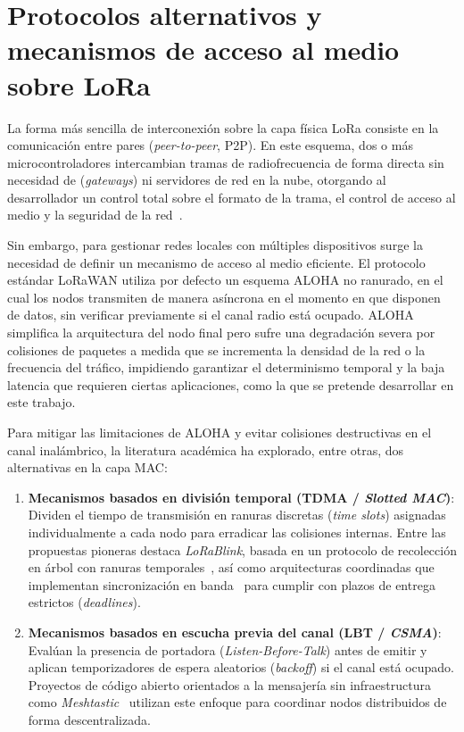 \section{Protocolos alternativos y mecanismos de acceso al medio sobre LoRa}

La forma más sencilla de interconexión sobre la capa física LoRa consiste en la comunicación entre pares (\textit{peer-to-peer}, P2P). En este esquema, dos o más microcontroladores intercambian tramas de radiofrecuencia de forma directa sin necesidad de (\textit{gateways}) ni servidores de red en la nube, otorgando al desarrollador un control total sobre el formato de la trama, el control de acceso al medio y la seguridad de la red~\cite{alam2021smart}.

Sin embargo, para gestionar redes locales con múltiples dispositivos surge la necesidad de definir un mecanismo de acceso al medio eficiente. El protocolo estándar LoRaWAN utiliza por defecto un esquema ALOHA no ranurado, en el cual los nodos transmiten de manera asíncrona en el momento en que disponen de datos, sin verificar previamente si el canal radio está ocupado. ALOHA simplifica la arquitectura del nodo final pero sufre una degradación severa por colisiones de paquetes a medida que se incrementa la densidad de la red o la frecuencia del tráfico, impidiendo garantizar el determinismo temporal y la baja latencia que requieren ciertas aplicaciones, como la que se pretende desarrollar en este trabajo.

Para mitigar las limitaciones de ALOHA y evitar colisiones destructivas en el canal inalámbrico, la literatura académica ha explorado, entre otras, dos alternativas en la capa MAC:

\begin{enumerate}
    \item \textbf{Mecanismos basados en división temporal (TDMA / \textit{Slotted MAC})}: Dividen el tiempo de transmisión en ranuras discretas (\textit{time slots}) asignadas individualmente a cada nodo para erradicar las colisiones internas. Entre las propuestas pioneras destaca \textit{LoRaBlink}, basada en un protocolo de recolección en árbol con ranuras temporales~\cite{bor2016lora}, así como arquitecturas coordinadas que implementan sincronización en banda~\cite{farahani2026sdlora} para cumplir con plazos de entrega estrictos (\textit{deadlines}).
    \item \textbf{Mecanismos basados en escucha previa del canal (LBT / \textit{CSMA})}: Evalúan la presencia de portadora (\textit{Listen-Before-Talk}) antes de emitir y aplican temporizadores de espera aleatorios (\textit{backoff}) si el canal está ocupado. Proyectos de código abierto orientados a la mensajería sin infraestructura como \textit{Meshtastic}~\cite{meshtastic} utilizan este enfoque para coordinar nodos distribuidos de forma descentralizada.
\end{enumerate}

